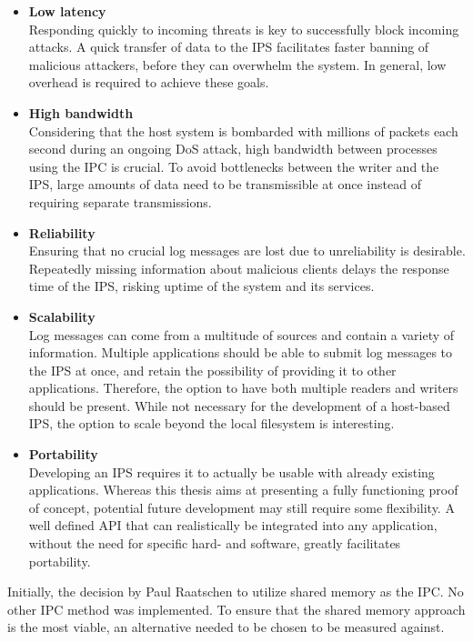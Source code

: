 \begin{itemize}
    \item \textbf{Low latency} \\
        Responding quickly to incoming threats is key to successfully block incoming attacks.
        A quick transfer of data to the \ac{IPS} facilitates faster banning of malicious attackers, before they can overwhelm the system.
        In general, low overhead is required to achieve these goals.
    \item \textbf{High bandwidth} \\
        Considering that the host system is bombarded with millions of packets each second during an ongoing \ac{DoS} attack, high bandwidth between processes using the \ac{IPC} is crucial.
        To avoid bottlenecks between the writer and the \ac{IPS}, large amounts of data need to be transmissible at once instead of requiring separate transmissions.
    \item \textbf{Reliability} \\
        Ensuring that no crucial log messages are lost due to unreliability is desirable.
        Repeatedly missing information about malicious clients delays the response time of the \ac{IPS}, risking uptime of the system and its services.
    \item \textbf{Scalability} \\
        Log messages can come from a multitude of sources and contain a variety of information.
        Multiple applications should be able to submit log messages to the \ac{IPS} at once, and retain the possibility of providing it to other applications.
        Therefore, the option to have both multiple readers and writers should be present.
        While not necessary for the development of a host-based \ac{IPS}, the option to scale beyond the local filesystem is interesting.
    \item \textbf{Portability} \\
        Developing an \ac{IPS} requires it to actually be usable with already existing applications.
        Whereas this thesis aims at presenting a fully functioning proof of concept, potential future development may still require some flexibility.
        A well defined \ac{API} that can realistically be integrated into any application, without the need for specific hard- and software, greatly facilitates portability.
\end{itemize}

Initially, the decision by Paul Raatschen to utilize shared memory as the \ac{IPC}\cite{raatschen:ipc}.
No other \ac{IPC} method was implemented.
To ensure that the shared memory approach is the most viable, an alternative needed to be chosen to be measured against.


